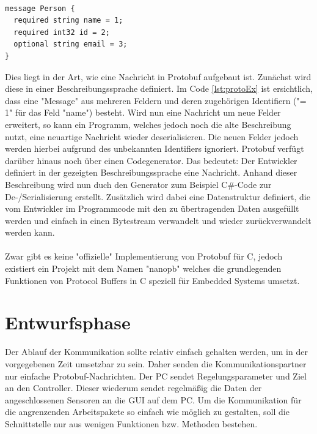 \paragraph{}
\begin{lstlisting}[caption=Beispieldefinition einer Protocol Buffers Nachricht, label=lst:protoEx]
message Person {
  required string name = 1;
  required int32 id = 2;
  optional string email = 3;
}
\end{lstlisting}
Dies liegt in der Art, wie eine Nachricht in Protobuf aufgebaut ist. Zunächst wird diese in einer Beschreibungssprache definiert.
Im Code \ref{lst:protoEx} ist ersichtlich, dass eine "Message" aus mehreren Feldern und deren zugehörigen Identifiern ("= 1" für das Feld "name") besteht. Wird nun eine Nachricht um neue Felder erweitert, so kann ein Programm, welches jedoch noch die alte Beschreibung nutzt, eine neuartige Nachricht wieder deserialisieren. Die neuen Felder jedoch werden hierbei aufgrund des unbekannten Identifiers ignoriert. Protobuf verfügt darüber hinaus noch über einen Codegenerator. Das bedeutet: Der Entwickler definiert in der gezeigten Beschreibungssprache eine Nachricht. Anhand dieser Beschreibung wird nun duch den Generator zum Beispiel C\#-Code zur De-/Serialisierung erstellt. Zusätzlich wird dabei eine Datenstruktur definiert, die vom Entwickler im Programmcode mit den zu übertragenden Daten ausgefüllt werden und einfach in einen Bytestream verwandelt und wieder zurückverwandelt werden kann.
\paragraph{}
Zwar gibt es keine "offizielle" Implementierung von Protobuf für C, jedoch existiert ein Projekt mit dem Namen "nanopb" welches die grundlegenden Funktionen von Protocol Buffers in C speziell für Embedded Systems umsetzt.
\section{Entwurfsphase}
Der Ablauf der Kommunikation sollte relativ einfach gehalten werden, um in der vorgegebenen Zeit umsetzbar zu sein. Daher senden die Kommunikationspartner nur einfache Protobuf-Nachrichten. Der PC sendet Regelungsparameter und Ziel an den Controller. Dieser wiederum sendet regelmäßig die Daten der angeschlossenen Sensoren an die GUI auf dem PC. Um die Kommunikation für die angrenzenden Arbeitspakete so einfach wie möglich zu gestalten, soll die Schnittstelle nur aus wenigen Funktionen bzw. Methoden bestehen.
